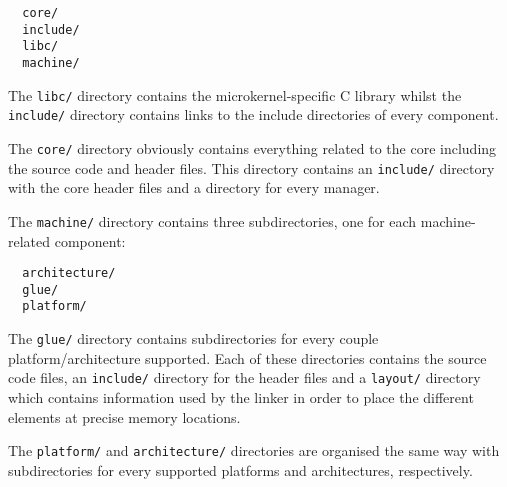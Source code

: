 \begin{verbatim}
  core/
  include/
  libc/
  machine/
\end{verbatim}

The \texttt{libc/} directory contains the microkernel-specific C library
whilst the \texttt{include/} directory contains links to the include
directories of every component.

The \texttt{core/} directory obviously contains everything related to the
core including the source code and header files. This directory contains
an \texttt{include/} directory with the core header files and a directory
for every manager.

The \texttt{machine/} directory contains three subdirectories, one for each
machine-related component:

\begin{verbatim}
  architecture/
  glue/
  platform/
\end{verbatim}

The \texttt{glue/} directory contains subdirectories for every couple
platform/architecture supported. Each of these directories contains the
source code files, an \texttt{include/} directory for the header files and
a \texttt{layout/} directory which contains information used by the linker
in order to place the different elements at precise memory locations.

The \texttt{platform/} and \texttt{architecture/} directories are organised
the same way with subdirectories for every supported platforms and
architectures, respectively.
